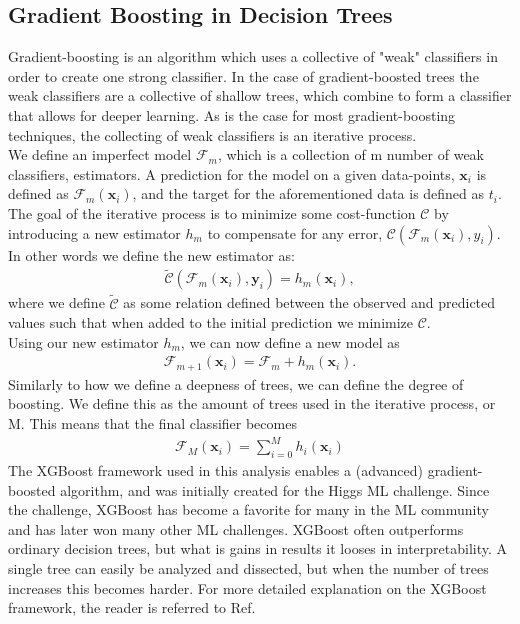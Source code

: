 \subsection{Gradient Boosting in Decision Trees}
Gradient-boosting is an algorithm which uses a collective of "weak" 
classifiers in order to create one strong classifier. In the case of gradient-boosted 
trees the weak classifiers are a collective of shallow trees, which combine to form a classifier 
that allows for deeper learning. As is the case for most gradient-boosting 
techniques, the collecting of weak classifiers is an iterative process.
\\
We define an imperfect model $\mathcal{F}_m$, which is a collection of m number of weak 
classifiers, estimators. A prediction for the model on a given data-points, $\textbf{x}_i$ is 
defined as $\mathcal{F}_m(\textbf{x}_i)$, and the target for the aforementioned data is 
defined as $t_i$. The goal of the iterative process is to minimize some cost-function 
$\mathcal{C}$ by introducing a new estimator $h_m$ to compensate for any error, 
$\mathcal{C}(\mathcal{F}_m(\textbf{x}_i), y_i)$. In other words we define the new estimator as:
\begin{align}
    \tilde{\mathcal{C}}(\mathcal{F}_m(\textbf{x}_i), \textbf{y}_i) = h_m(\textbf{x}_i),
\end{align}
where we define $\tilde{\mathcal{C}}$ as some relation defined between the observed and 
predicted values such that when added to the initial prediction we minimize $\mathcal{C}$.
\\
Using our new estimator $h_m$, we can now define a new model as
\begin{align}
    \mathcal{F}_{m+1}(\textbf{x}_i) = \mathcal{F}_m + h_m (\textbf{x}_i).
\end{align}
Similarly to how we define a deepness of trees, we can define the degree of boosting. We define 
this as the amount of trees used in the iterative process, or M. This means that the final classifier 
becomes
\begin{align}
    \mathcal{F}_M (\textbf{x}_i) = \sum_{i=0}^M h_i(\textbf{x}_i)
\end{align} 
The XGBoost \cite{XGB} framework used in this analysis enables a (advanced) gradient-boosted algorithm, 
and was initially created for the Higgs ML challenge. Since the challenge, XGBoost has become 
a favorite for many in the ML community and has later won many other ML challenges. XGBoost 
often outperforms ordinary decision trees, but what is gains in results it looses in 
interpretability. A single tree can easily be analyzed and dissected, but when the number 
of trees increases this becomes harder. For more detailed explanation on the XGBoost framework,
the reader is referred to Ref.\cite{XGB}